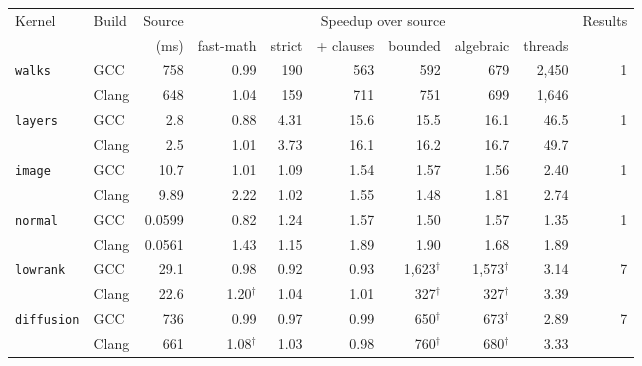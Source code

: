 \begin{tabular}{llrrrrrrrr}
\toprule
Kernel & Build & Source & \multicolumn{6}{c}{Speedup over source} & Results\\
\cmidrule(lr){4-9}
 & & (ms) & fast-math & strict & + clauses & bounded & algebraic & threads & \\
\midrule
\texttt{walks} & GCC & 758 & 0.99 & 190 & 563 & 592 & 679 & 2,450 & 1\\
 & Clang & 648 & 1.04 & 159 & 711 & 751 & 699 & 1,646 & \\
\addlinespace
\texttt{layers} & GCC & 2.8 & 0.88 & 4.31 & 15.6 & 15.5 & 16.1 & 46.5 & 1\\
 & Clang & 2.5 & 1.01 & 3.73 & 16.1 & 16.2 & 16.7 & 49.7 & \\
\addlinespace
\texttt{image} & GCC & 10.7 & 1.01 & 1.09 & 1.54 & 1.57 & 1.56 & 2.40 & 1\\
 & Clang & 9.89 & 2.22 & 1.02 & 1.55 & 1.48 & 1.81 & 2.74 & \\
\addlinespace
\texttt{normal} & GCC & 0.0599 & 0.82 & 1.24 & 1.57 & 1.50 & 1.57 & 1.35 & 1\\
 & Clang & 0.0561 & 1.43 & 1.15 & 1.89 & 1.90 & 1.68 & 1.89 & \\
\addlinespace
\texttt{lowrank} & GCC & 29.1 & 0.98 & 0.92 & 0.93 & 1,623$^\dagger$ & 1,573$^\dagger$ & 3.14 & 7\\
 & Clang & 22.6 & 1.20$^\dagger$ & 1.04 & 1.01 & 327$^\dagger$ & 327$^\dagger$ & 3.39 & \\
\addlinespace
\texttt{diffusion} & GCC & 736 & 0.99 & 0.97 & 0.99 & 650$^\dagger$ & 673$^\dagger$ & 2.89 & 7\\
 & Clang & 661 & 1.08$^\dagger$ & 1.03 & 0.98 & 760$^\dagger$ & 680$^\dagger$ & 3.33 & \\
\bottomrule
\end{tabular}
